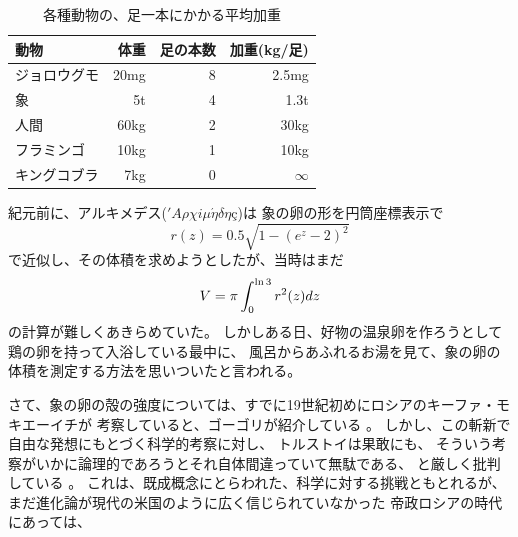 \documentclass[11pt,a4paper,twoside]{jarticle}
\newcommand{\研究種別}{A}	%
\newcommand{\研究課題名}{コ・クリエイティブなソフトウェア開発者を育成するPBL型教育}
\newcommand{\研究機関名}{産業技術大学院大学}
\newcommand{\研究代表者氏名}{中鉢　欣秀}
\newcommand{\研究代表者氏名ふりがな}{ちゅうばち　よしひで}
\newcommand{\本応募effort}{\KLEffort{18}}	%
\newcommand{\研究期間の最終元号年度}{27}	%
\begin{document}
{         \begin{table}
         		\caption{各種動物の、足一本にかかる平均加重}
		\label{tab:load}
         		\begin{tabular}{lrrr}
			\hline
			動物 & 体重 & 足の本数 & 加重(kg/足)\\
			\hline
			ジョロウグモ	& 20mg	& 8	& 2.5mg \\
			象 			& 5t & 4	& 1.3t \\
			人間 			& 60kg	& 2	& 30kg\\
			フラミンゴ	& 10kg	& 1	& 10kg\\
			キングコブラ	& 7kg	& 0	& $\infty$\\
			\hline
		\end{tabular}
         \end{table}

         紀元前に、アルキメデス(\('A\rho\chi i\mu\acute{\eta}\delta\eta\mbox{\c{c}}\))は
	象の卵の形を円筒座標表示で
         \[r(z) = 0.5\sqrt{1-(e^z-2)^2}\]
         で近似し、その体積を求めようとしたが、当時はまだ
         \begin{equation}
	         V  = \pi \int_0^{\ln 3} r^2(z) dz\\
         \end{equation}
         の計算が難しくあきらめていた。
         しかしある日、好物の温泉卵を作ろうとして鶏の卵を持って入浴している最中に、
         風呂からあふれるお湯を見て、象の卵の体積を測定する方法を思いついたと言われる。
 
	さて、象の卵の殻の強度については、すでに19世紀初めにロシアのキーファ・モキエーイチが
	考察していると、ゴーゴリが紹介している
	\cite{gogori}。
	しかし、この斬新で自由な発想にもとづく科学的考察に対し、
	トルストイは果敢にも、
	そういう考察がいかに論理的であろうとそれ自体間違っていて無駄である、
	と厳しく批判している
	\cite{torusutoi}。
	これは、既成概念にとらわれた、科学に対する挑戦ともとれるが、
	まだ進化論が現代の米国のように広く信じられていなかった
	帝政ロシアの時代にあっては、

}
\end{document}
